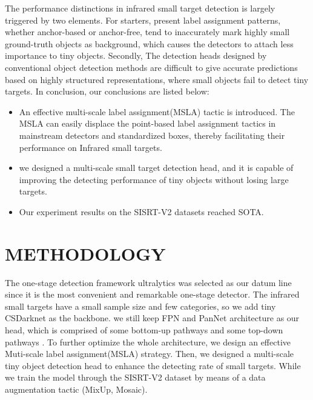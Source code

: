 \documentclass[journal]{IEEEtran}
\begin{document}
The performance distinctions in infrared small target detection is largely triggered by two elements. For starters, present label assignment patterns, whether anchor-based or anchor-free, tend to inaccurately mark highly small ground-truth objects as background, which causes the detectors to attach less importance to tiny objects. Secondly, The detection heads designed by conventional object detection methods are difficult to give accurate predictions based on highly structured representations, where small objects fail to detect tiny targets. In conclusion, our conclusions are listed below: 

\begin{itemize}
  \item An effective multi-scale label assignment(MSLA) tactic is introduced. The MSLA can easily displace the point-based label assignment tactics in mainstream detectors and standardized boxes, thereby facilitating their performance on Infrared small targets.       
  \item we designed a multi-scale small target detection head,  and it is capable of improving the detecting performance of tiny objects without losing large targets.
  \item Our experiment results on the SISRT-V2 datasets reached SOTA.
\end{itemize}

\section{METHODOLOGY}
The one-stage detection framework ultralytics was selected as our datum line since it is the most convenient and remarkable one-stage detector\cite{glenn_jocher_2022_7347926}. The infrared small targets have a small sample size and few categories, so we add tiny CSDarknet as the backbone. we still keep FPN and PanNet architecture as our head, which is comprised of some bottom-up pathways and some top-down pathways \cite{lin2017feature}\cite{PanNet}. To further optimize the whole architecture, we design an effective Muti-scale label assignment(MSLA) strategy. Then, we designed a multi-scale tiny object detection head to enhance the detecting rate of small targets. While we train the model through the SISRT-V2 dataset by means of a data augmentation tactic (MixUp, Mosaic).
\end{document}
